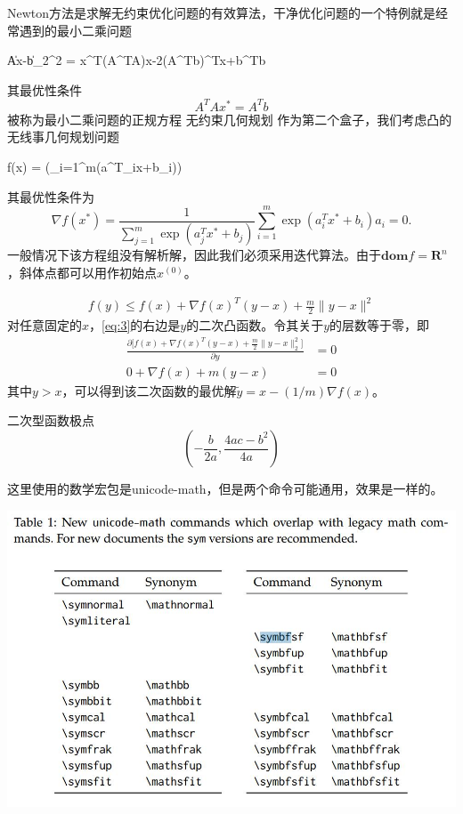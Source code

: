 \documentclass{lsbook}
\begin{document}
Newton方法是求解无约束优化问题的有效算法，干净优化问题的一个特例就是经常遇到的最小二乘问题
\begin{mini}[2]
	{}{\|Ax-b\|_2^2 = x^T(A^TA)x-2(A^Tb)^Tx+b^Tb}
	{\label{eq:Ex2}}{}
\end{mini}


其最优性条件
\[
A^TAx^\ast = A^Tb
\]
被称为最小二乘问题的\textsf{正规方程}
\mbox{无约束几何规划}
作为第二个盒子，我们考虑凸的无线事几何规划问题


\begin{mini}[2]
	{}{f(x) = \log \left(\sum_{i=1}^{m}\exp(a^T_ix+b_i)\right)}
	{\label{eq:Ex2}}{}
\end{mini}


其最优性条件为
\[
\nabla f(x^\ast) = \frac{1}{\sum\limits_{j=1}^m\exp(a^T_jx^\ast + b_j)}\sum_{i=1}^{m}\exp(a^T_ix^\ast+b_i)a_i=0.
\]
一般情况下该方程组没有解析解，因此我们必须采用迭代算法。由于$\symbf{dom}f=\symbf{R}^n$，斜体点都可以用作初始点$x^{(0)}$。

\begin{align}\label{eq:3}
f(y) \leqslant f(x) + \nabla f(x)^T(y-x) + \frac{m}{2}\|y-x\|^2
\end{align}
对任意固定的$x$，\cref{eq:3}的右边是$y$的二次凸函数。令其关于$y$的层数等于零，即
\begin{align}\label{eq:4}
\frac{\partial\bigl[f(x) + \nabla f(x)^T(y-x) + \frac{m}{2}\|y-x\|_2^2\bigr]}{\partial y} &= 0\\
0 + \nabla f(x) + m(y-x) &=0\label{eq:5}
\end{align}
其中$y>x$，可以得到该二次函数的最优解$\tilde{y}=x-(1/m)\nabla f(x)$。

二次型函数极点
\[\left(-\frac{b}{2a},\frac{4ac-b^2}{4a}\right)\]



这里使用的数学宏包是unicode-math，但是两个命令可能通用，效果是一样的。

\includegraphics[width=0.7\linewidth]{unimath}
\end{document}
